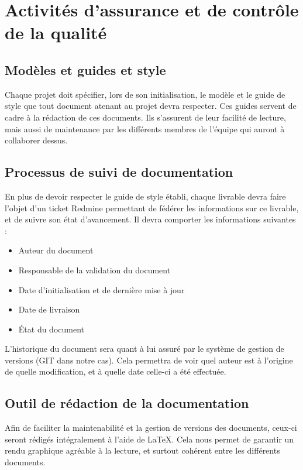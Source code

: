 \section{Activités d'assurance et de contrôle de la qualité}

\subsection{Modèles et guides et style}

Chaque projet doit spécifier, lors de son initialisation, le modèle et le guide de style que tout document atenant au projet devra respecter.
Ces guides servent de cadre à la rédaction de ces documents. Ils s'assurent de leur facilité de lecture, mais aussi de maintenance par les différents membres de l'équipe qui auront à collaborer dessus.

\subsection{Processus de suivi de documentation}

En plus de devoir respecter le guide de style établi, chaque livrable devra faire l'objet d'un ticket Redmine permettant de fédérer les informations sur ce livrable, et de suivre son état d'avancement. Il devra comporter les informations suivantes :

\begin{itemize}

\item Auteur du document
\item Responsable de la validation du document
\item Date d’initialisation et de dernière mise à jour
\item Date de livraison
\item État du document

\end{itemize}

L'historique du document sera quant à lui assuré par le système de gestion de versions (GIT dans notre cas). Cela permettra de voir quel auteur est à l'origine de quelle modification, et à quelle date celle-ci a été effectuée.

\subsection{Outil de rédaction de la documentation}

Afin de faciliter la maintenabilité et la gestion de versions des documents, ceux-ci seront rédigés intégralement à l'aide de LaTeX. Cela nous permet de garantir un rendu graphique agréable à la lecture, et surtout cohérent entre les différents documents.

